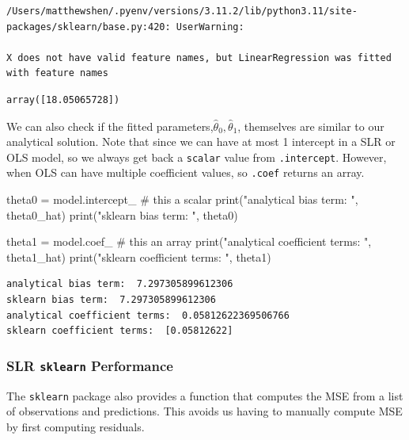 \documentclass[
  letterpaper,
  DIV=11,
  numbers=noendperiod]{scrreprt}
\newenvironment{Shaded}{\begin{snugshade}}{\end{snugshade}}
\newcommand{\BuiltInTok}[1]{\textcolor[rgb]{0.00,0.23,0.31}{#1}}
\newcommand{\CommentTok}[1]{\textcolor[rgb]{0.37,0.37,0.37}{#1}}
\newcommand{\NormalTok}[1]{\textcolor[rgb]{0.00,0.23,0.31}{#1}}
\newcommand{\OperatorTok}[1]{\textcolor[rgb]{0.37,0.37,0.37}{#1}}
\newcommand{\StringTok}[1]{\textcolor[rgb]{0.13,0.47,0.30}{#1}}
\begin{document}
\begin{verbatim}
/Users/matthewshen/.pyenv/versions/3.11.2/lib/python3.11/site-packages/sklearn/base.py:420: UserWarning:

X does not have valid feature names, but LinearRegression was fitted with feature names
\end{verbatim}

\begin{verbatim}
array([18.05065728])
\end{verbatim}

We can also check if the fitted
parameters,\(\hat{\theta}_0,\hat{\theta}_1\), themselves are similar to
our analytical solution. Note that since we can have at most 1 intercept
in a SLR or OLS model, so we always get back a \texttt{scalar} value
from \texttt{.intercept}. However, when OLS can have multiple
coefficient values, so \texttt{.coef} returns an array.

\begin{Shaded}
\begin{Highlighting}[]
\NormalTok{theta0 }\OperatorTok{=}\NormalTok{ model.intercept\_      }\CommentTok{\# this a scalar}
\BuiltInTok{print}\NormalTok{(}\StringTok{"analytical bias term: "}\NormalTok{, theta0\_hat)}
\BuiltInTok{print}\NormalTok{(}\StringTok{"sklearn bias term: "}\NormalTok{, theta0)}


\NormalTok{theta1 }\OperatorTok{=}\NormalTok{ model.coef\_           }\CommentTok{\# this an array}
\BuiltInTok{print}\NormalTok{(}\StringTok{"analytical coefficient terms: "}\NormalTok{, theta1\_hat)}
\BuiltInTok{print}\NormalTok{(}\StringTok{"sklearn coefficient terms: "}\NormalTok{, theta1)}
\end{Highlighting}
\end{Shaded}

\begin{verbatim}
analytical bias term:  7.297305899612306
sklearn bias term:  7.297305899612306
analytical coefficient terms:  0.05812622369506766
sklearn coefficient terms:  [0.05812622]
\end{verbatim}

\hypertarget{slr-sklearn-performance}{%
\subsubsection{\texorpdfstring{SLR \texttt{sklearn}
Performance}{SLR sklearn Performance}}\label{slr-sklearn-performance}}

The \texttt{sklearn} package also provides a function that computes the
MSE from a list of observations and predictions. This avoids us having
to manually compute MSE by first computing residuals.
\end{document}
